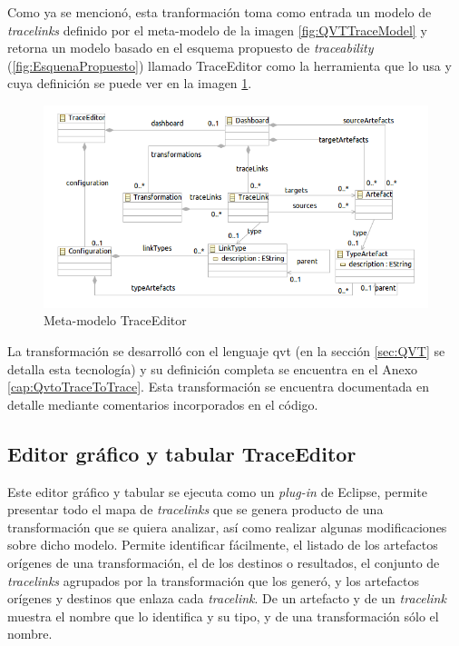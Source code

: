 \documentclass[a4paper,12pt,twoside,spanish,openright]{book}
\begin{document}
Como ya se mencionó, esta tranformación toma como entrada un modelo de \textit{tracelinks} definido por el meta-modelo de la imagen \ref{fig:QVTTraceModel} y retorna un modelo basado en el esquema propuesto de \textit{traceability} (\ref{fig:EsquenaPropuesto}) llamado \textsf{TraceEditor} como la herramienta que lo usa y cuya definición se puede ver en la imagen \ref{fig:TraceEditorMetaModel}.


\begin{figure}[hbtp]
\centering
\includegraphics[scale=.61]{./img/TraceEditorMetaModel}
\caption{Meta-modelo TraceEditor}
\label{fig:TraceEditorMetaModel}
\end{figure}


La transformación se desarrolló con el lenguaje \gls{qvt} (en la sección \ref{sec:QVT} se detalla esta tecnología) y su definición completa se encuentra en el Anexo \ref{cap:QvtoTraceToTrace}. Esta transformación se encuentra documentada en detalle mediante comentarios incorporados en el código.



\subsection{Editor gráfico y tabular TraceEditor}

Este editor gráfico y tabular se ejecuta como un \textit{plug-in} de \textsf{Eclipse}, permite presentar todo el mapa de \textit{tracelinks} que se genera producto de una transformación que se quiera analizar, así como realizar algunas modificaciones sobre dicho modelo. Permite identificar fácilmente, el listado de los artefactos orígenes de una transformación, el de los destinos o resultados, el conjunto de \textit{tracelinks} agrupados por la transformación que los generó, y los artefactos orígenes y destinos que enlaza cada \textit{tracelink}. De un artefacto y de un \textit{tracelink} muestra el nombre que lo identifica y su tipo, y de una transformación sólo el nombre.
\end{document}
